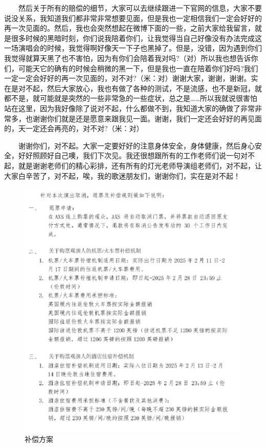 \documentclass[]{ctexbook}
\begin{document}
  然后关于所有的赔偿的细节，大家可以去继续跟进一下官网的信息，大家不要说没关系，我知道我们都非常非常想要见面，但是我也一定相信我们一定会好好的再一次见面的。然后，我也会突然想起在微博下面的一些，之前大家给我留言，就是很多时候的黑暗时刻，你们说我陪着你们，让我觉得当自己好像没有办法完成这一场演唱会的时候，我觉得啊好像天一下子也黑掉了。但是，没错，因为遇到你们我觉得就算天黑了也不害怕，因为有你们会陪着我对吗?（对）所以我也想告诉你们，可能天它的确有的时候会稍微的黑一下，但是我也一直在陪着你们好吗?我们一定一定会好好的再一次见面的，对不对?（米：对）谢谢大家，谢谢，谢谢。实在是对不起，然后大家放心，我也有做了各种的测试，不是流感，也不是新冠，就都不是，就可能就是突然的一些非常急的一些症状，总之是\ldots\ldots 所以我就说很害怕站在这里，因为我好像除了说对不起，什么都做不到，我知道大家的确做了非常非常多，也谢谢你们就是还是愿意来跟我见一面。谢谢，我们一定还会好好的再见面的，天一定还会再亮的，对不对?（米：对）

  谢谢你们，对不起。大家一定要好好的注意身体安全，身体健康，然后身心安全，好好照顾好自己噢，我们下次见。我还很想跟所有的工作老师们说一句对不起，就是谢谢老师们的精心彩排，还有所有的灯光老师导演组老师们，对不起，让大家白辛苦了，对不起，唉，我的歌迷朋友们，谢谢你们，实在是对不起！

\begin{figure}

{\centering \includegraphics[width=400pt]{img/london20250214/compensation} 

}

\caption{补偿方案}\label{fig:unnamed-chunk-171}
\end{figure}
\end{document}
